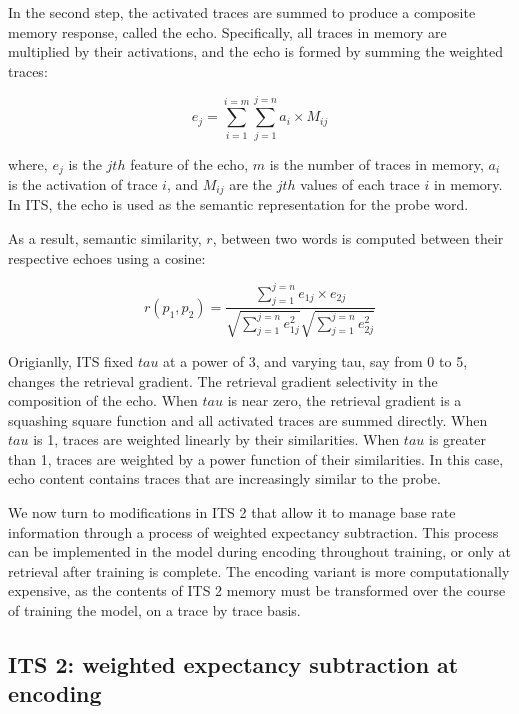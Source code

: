 \documentclass[
  jou]{apa6}
\begin{document}
In the second step, the activated traces are summed to produce a composite memory response, called the echo. Specifically, all traces in memory are multiplied by their activations, and the echo is formed by summing the weighted traces:

\begin{equation}
e_j = \sum_{i=1}^{i=m}\sum_{j=1}^{j=n}a_i \times M_{ij}
\label{eq:echo}
\end{equation}

where, \(e_j\) is the \(jth\) feature of the echo, \(m\) is the number of traces in memory, \(a_i\) is the activation of trace \(i\), and \(M_{ij}\) are the \(jth\) values of each trace \(i\) in memory. In ITS, the echo is used as the semantic representation for the probe word.

As a result, semantic similarity, \(r\), between two words is computed between their respective echoes using a cosine:

\begin{equation}
r(p_1,p_2) = \frac{\sum_{j=1}^{j=n}e_{1j} \times{} e_{2j}}{\sqrt{\sum_{j=1}^{j=n}e_{1j}^2}\sqrt{\sum_{j=1}^{j=n}e_{2j}^2}}
\label{eq:semanticsim}
\end{equation}

Origianlly, ITS fixed \(tau\) at a power of 3, and varying tau, say from 0 to 5, changes the retrieval gradient. The retrieval gradient selectivity in the composition of the echo. When \(tau\) is near zero, the retrieval gradient is a squashing square function and all activated traces are summed directly. When \(tau\) is 1, traces are weighted linearly by their similarities. When \(tau\) is greater than 1, traces are weighted by a power function of their similarities. In this case, echo content contains traces that are increasingly similar to the probe.

We now turn to modifications in ITS 2 that allow it to manage base rate information through a process of weighted expectancy subtraction. This process can be implemented in the model during encoding throughout training, or only at retrieval after training is complete. The encoding variant is more computationally expensive, as the contents of ITS 2 memory must be transformed over the course of training the model, on a trace by trace basis.

\hypertarget{its-2-weighted-expectancy-subtraction-at-encoding}{%
\subsection{ITS 2: weighted expectancy subtraction at encoding}\label{its-2-weighted-expectancy-subtraction-at-encoding}}
\end{document}
